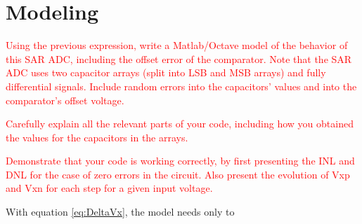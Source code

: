 \section{Modeling}
\label{sec:modeling}

\textcolor{red}{Using the previous expression, write a Matlab/Octave model of the behavior of
this SAR ADC, including the offset error of the comparator. Note that the SAR
ADC uses two capacitor arrays (split into LSB and MSB arrays) and fully
differential signals. Include random errors into the capacitors' values and into
the comparator's offset voltage.}

\textcolor{red}{Carefully explain all the relevant parts of your code, including how you obtained the values for the capacitors in the arrays.}

\textcolor{red}{Demonstrate that your code is working correctly, by first presenting the INL and DNL for the case of zero errors in the circuit. Also present the evolution of Vxp and Vxn for each step for a given input voltage.}

With equation \ref{eq:DeltaVx}, the model needs only to 

